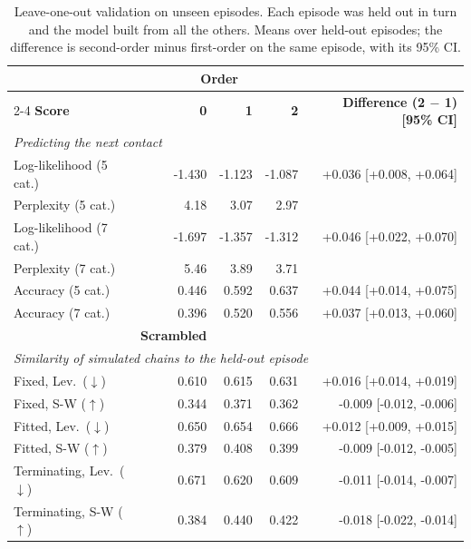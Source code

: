 \begin{table}[htbp]
\centering
\small
\caption{Leave-one-out validation on unseen episodes. Each episode was held out in turn and the model built from all the others. Means over held-out episodes; the difference is second-order minus first-order on the same episode, with its 95\% CI.}
\label{tab:loo}
\setlength{\tabcolsep}{3pt}
\begin{tabular*}{\linewidth}{@{\extracolsep{\fill}}lrrrr}
\toprule
 & \multicolumn{3}{c}{\textbf{Order}} & \\
\cmidrule(lr){2-4}
\textbf{Score} & \textbf{0} & \textbf{1} & \textbf{2} & \textbf{Difference (2 $-$ 1) [95\% CI]} \\
\midrule
\multicolumn{5}{l}{\textit{Predicting the next contact}} \\
Log-likelihood (5 cat.) & -1.430 & -1.123 & -1.087 & +0.036 [+0.008, +0.064] \\
Perplexity (5 cat.) & 4.18 & 3.07 & 2.97 & \\
Log-likelihood (7 cat.) & -1.697 & -1.357 & -1.312 & +0.046 [+0.022, +0.070] \\
Perplexity (7 cat.) & 5.46 & 3.89 & 3.71 & \\
Accuracy (5 cat.) & 0.446 & 0.592 & 0.637 & +0.044 [+0.014, +0.075] \\
Accuracy (7 cat.) & 0.396 & 0.520 & 0.556 & +0.037 [+0.013, +0.060] \\
\addlinespace
 & \textbf{Scrambled} & & & \\
\multicolumn{5}{l}{\textit{Similarity of simulated chains to the held-out episode}} \\
Fixed, Lev.\ ($\downarrow$) & 0.610 & 0.615 & 0.631 & +0.016 [+0.014, +0.019] \\
Fixed, S-W ($\uparrow$) & 0.344 & 0.371 & 0.362 & -0.009 [-0.012, -0.006] \\
Fitted, Lev.\ ($\downarrow$) & 0.650 & 0.654 & 0.666 & +0.012 [+0.009, +0.015] \\
Fitted, S-W ($\uparrow$) & 0.379 & 0.408 & 0.399 & -0.009 [-0.012, -0.005] \\
Terminating, Lev.\ ($\downarrow$) & 0.671 & 0.620 & 0.609 & -0.011 [-0.014, -0.007] \\
Terminating, S-W ($\uparrow$) & 0.384 & 0.440 & 0.422 & -0.018 [-0.022, -0.014] \\
\bottomrule
\end{tabular*}
\par\smallskip
\begin{minipage}{\linewidth}\footnotesize

\end{minipage}
\end{table}
